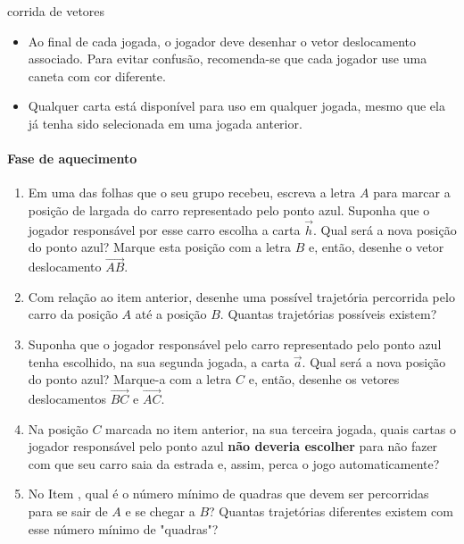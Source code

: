 \begin{task}{ corrida de vetores}
\begin{itemize}
\item {} 
Ao final de cada jogada, o jogador deve desenhar o vetor deslocamento associado. Para evitar confusão, recomenda-se que cada jogador use uma caneta com cor diferente.

\item {} 
Qualquer carta está disponível para uso em qualquer jogada, mesmo que ela já tenha sido selecionada em uma jogada anterior.

\end{itemize}

\paragraph{Fase de aquecimento}
\begin{enumerate}
\item {} 
Em uma das folhas que o seu grupo recebeu, escreva a letra \(A\) para marcar a posição de largada do carro representado pelo ponto azul. Suponha que o jogador responsável por esse carro escolha a carta \(\vec{h}\). Qual será a nova posição do ponto azul? Marque esta posição com a letra \(B\) e, então, desenhe o vetor deslocamento \(\overrightarrow{AB}\).

\item {} 
Com relação ao item anterior, desenhe uma possível trajetória percorrida pelo carro da posição \(A\) até a posição \(B\). Quantas trajetórias possíveis existem?

\item {} 
Suponha que o jogador responsável pelo carro representado pelo ponto azul tenha escolhido, na sua segunda jogada, a carta \(\vec{a}\). Qual será a nova posição do ponto azul? Marque-a com a letra \(C\) e, então, desenhe os vetores deslocamentos \(\overrightarrow{BC}\) e \(\overrightarrow{AC}\).

\item {} 
Na posição \(C\) marcada no item anterior, na sua terceira jogada, quais cartas o jogador responsável pelo ponto azul \textbf{não deveria escolher} para não fazer com que seu carro saia da estrada e, assim, perca o jogo automaticamente?

\item {} 
No Item , qual é o número mínimo de quadras que devem ser percorridas para se sair de \(A\) e se chegar a \(B\)? Quantas trajetórias diferentes existem com esse número mínimo de "quadras"?

\end{enumerate}


\end{task}
